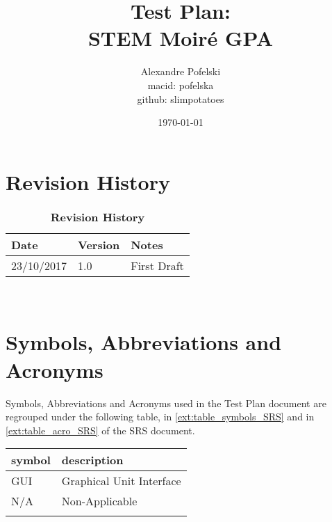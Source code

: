 \documentclass[12pt, titlepage]{article}
\begin{document}
\title{Test Plan:\\
		STEM Moir{\'e} GPA} 
\author{Alexandre Pofelski \\
		macid: pofelska \\
		github: slimpotatoes}
\date{\today}
	
\maketitle


\section{Revision History}

\begin{table}[h]
\caption{\bf Revision History}
\begin{tabularx}{\textwidth}{p{3cm}p{2cm}X}
\toprule {\bf Date} & {\bf Version} & {\bf Notes}\\
\midrule
23/10/2017 & 1.0 & First Draft\\
\bottomrule
\end{tabularx}
\end{table}

~\newpage

\section{Symbols, Abbreviations and Acronyms}
\label{symbols}

Symbols, Abbreviations and Acronyms used in the Test Plan document are regrouped under the following table, in \cref{ext:table_symbols_SRS} and in \cref{ext:table_acro_SRS} of the SRS document. \par\medskip

\renewcommand{\arraystretch}{1.2}
\begin{tabular}{l l} 
  \toprule		
  \textbf{symbol} & \textbf{description}\\
  \midrule 
  GUI & Graphical Unit Interface \\
  N/A & Non-Applicable \\
  \bottomrule
  \label{table_acro_Test_Plan}
\end{tabular}


\newpage

\tableofcontents

\listoftables

\newpage
\end{document}
